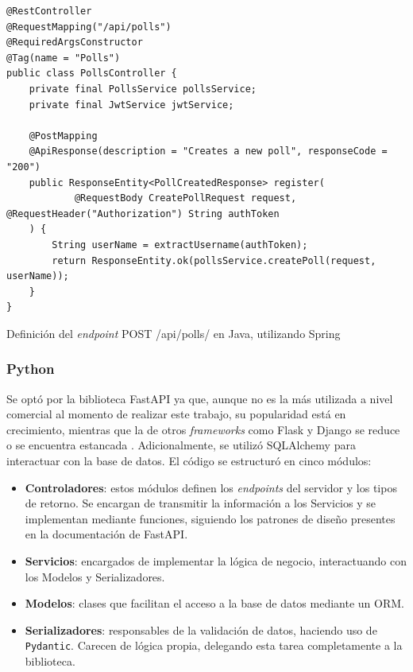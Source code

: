 \documentclass[11pt]{article}
\let\Oldsubsubsection\subsubsection
\renewcommand{\subsubsection}{\FloatBarrier\Oldsubsubsection}
\newcommand{\english}[1]{\textit{#1}}
\begin{document}
\begin{listing}
\begin{verbatim}
@RestController
@RequestMapping("/api/polls")
@RequiredArgsConstructor
@Tag(name = "Polls")
public class PollsController {
    private final PollsService pollsService;
    private final JwtService jwtService;

    @PostMapping
    @ApiResponse(description = "Creates a new poll", responseCode = "200")
    public ResponseEntity<PollCreatedResponse> register(
            @RequestBody CreatePollRequest request, @RequestHeader("Authorization") String authToken
    ) {
        String userName = extractUsername(authToken);
        return ResponseEntity.ok(pollsService.createPoll(request, userName));
    }
}
\end{verbatim}
\caption{Definición del \english{endpoint} POST /api/polls/ en Java, utilizando Spring}
\label{code:http_java_endpoint}
\end{listing}

\subsubsection{Python}

Se optó por la biblioteca FastAPI \cite{python:lib:fastapi} ya que, aunque no es la más utilizada a nivel comercial al momento de realizar este trabajo, su popularidad está en crecimiento, mientras que la de otros \textit{frameworks} como Flask \cite{python:lib:flask} y Django \cite{python:lib:django} se reduce o se encuentra estancada \cite{http:python_survey}. Adicionalmente, se utilizó SQLAlchemy \cite{python:lib:sqlalchemy} para interactuar con la base de datos. El código se estructuró en cinco módulos:

\begin{itemize}
    \item \textbf{Controladores}: estos módulos definen los \textit{endpoints} del servidor y los tipos de retorno. Se encargan de transmitir la información a los Servicios y se implementan mediante funciones, siguiendo los patrones de diseño presentes en la documentación de FastAPI.
    \item \textbf{Servicios}: encargados de implementar la lógica de negocio, interactuando con los Modelos y Serializadores.
    \item \textbf{Modelos}: clases que facilitan el acceso a la base de datos mediante un ORM.
    \item \textbf{Serializadores}: responsables de la validación de datos, haciendo uso de \lstinline{Pydantic}. Carecen de lógica propia, delegando esta tarea completamente a la biblioteca.
\end{itemize}
\end{document}
